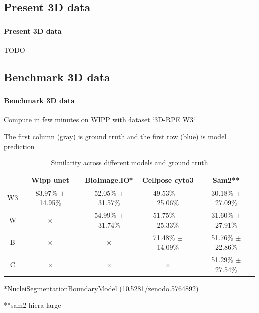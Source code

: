 \iffalse
\def\slidetitle{Present 3D data}

\subsection{\slidetitle}
\begin{frame}
  \frametitle{\sectiontitle}
  \framesubtitle{\slidetitle}

  TODO

\end{frame}

\def\slidetitle{Benchmark 3D data}

\subsection{\slidetitle}
\begin{frame}
  \frametitle{\sectiontitle}
  \framesubtitle{\slidetitle}

  Compute in few minutes on WIPP with dataset `3D-RPE W3`

  The first column (gray) is ground truth and the first row (blue) is model prediction

  \begin{center}
    \begin{table}
      \begin{tabular}{|c|c|c|c|c|}
       \hline
       \rowcolor{tableFirstRowColor}      & Wipp unet             & BioImage.IO*          & Cellpose cyto3        & Sam2**   \\ [0.5ex]
       \hline
       \cellcolor{tableFirstColColor} W3  & 83.97\% $\pm$ 14.95\% & 52.05\% $\pm$ 31.57\% & 49.53\% $\pm$ 25.06\% & 30.18\% $\pm$ 27.09\% \\
       \hline
       \cellcolor{tableFirstColColor} W   & $\times$              & 54.99\% $\pm$ 31.74\% & 51.75\% $\pm$ 25.33\% & 31.60\% $\pm$ 27.91\% \\
       \hline
       \cellcolor{tableFirstColColor} B   & $\times$              & $\times$              & 71.48\% $\pm$ 14.09\% & 51.76\% $\pm$ 22.86\% \\
       \hline
       \cellcolor{tableFirstColColor} C   & $\times$              & $\times$              & $\times$              & 51.29\% $\pm$ 27.54\% \\
       \hline
      \end{tabular}
      \caption{Similarity across different models and ground truth}
    \end{table}
  \end{center}

  *NucleiSegmentationBoundaryModel (10.5281/zenodo.5764892)

  **sam2-hiera-large

\end{frame}

